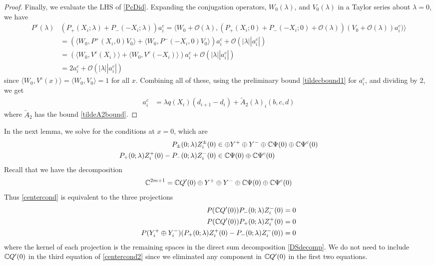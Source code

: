 \documentclass[thesis.tex]{subfiles}
\begin{document}
\begin{lemma}
\begin{proof}
Finally, we evaluate the LHS of \cref{PcDid}. Expanding the conjugation operators, $W_0(\lambda)$, and $V_0(\lambda)$ in a Taylor series about $\lambda = 0$, we have
\begin{align*}
P^c(\lambda) &(P_+(X_i; \lambda) + P_-(-X_i; \lambda))a_i^c 
= \langle W_0 + \mathcal{O}(\lambda), (P_+(X_i; 0) + P_-(-X_i; 0) + \mathcal{O}(\lambda))(V_0 + \mathcal{O}(\lambda))a_i^c) \rangle \\
&= \left( \langle W_0, P^+(X_i, 0)V_0 \rangle + \langle W_0, P^-(-X_i, 0)V_0 \rangle \right)a_i^c + \mathcal{O}(|\lambda||a_i^c|) \\
&= \left( \langle W_0, V^c(X_i) \rangle + \langle W_0, V^c(-X_i) \rangle \right)a_i^c + \mathcal{O}(|\lambda||a_i^c|) \\
&= 2 a_i^c + \mathcal{O}(|\lambda||a_i^c|)
\end{align*}
since $\langle W_0, V^c(x) \rangle = \langle W_0, V_0 \rangle = 1$ for all $x$. Combining all of these, using the preliminary bound \cref{tildecbound1} for $a_i^c$, and dividing by 2, we get
\begin{align}\label{ciexp1}
a_i^c &= \lambda q(X_i) (d_{i+1} - d_i ) + \tilde{A}_2(\lambda)_i(b, c, d)
\end{align}
where $\tilde{A}_2$ has the bound \cref{tildeA2bound}.
\end{proof}
\end{lemma}

In the next lemma, we solve for the conditions at $x = 0$, which are
\begin{equation}\label{centercond}
\begin{aligned}
P_\pm(0; \lambda) Z_i^\pm(0) &\in \oplus Y^+ \oplus Y^- \oplus \mathbb{C} \Psi(0) \oplus \mathbb{C} \Psi^c(0) \\
P_+(0; \lambda) Z_i^+(0) - P_-(0; \lambda) Z_i^-(0) &\in \mathbb{C} \Psi(0) \oplus \mathbb{C} \Psi^c(0)
\end{aligned}
\end{equation}
Recall that we have the decomposition
\begin{equation}\label{DSdecomp}
\mathbb{C}^{2m+1} = \mathbb{C} Q'(0) \oplus Y^+ \oplus Y^- \oplus \mathbb{C} \Psi(0) \oplus \mathbb{C} \Psi^c(0)
\end{equation}
Thus \eqref{centercond} is equivalent to the three projections
\begin{equation}\label{centercond2}
\begin{aligned}
P(\mathbb{C} Q'(0) ) P_-(0; \lambda) Z_i^-(0) &= 0 \\
P(\mathbb{C} Q'(0) ) P_+(0; \lambda) Z_i^+(0) &= 0 \\
P(Y_i^+ \oplus Y_i^-) ( P_+(0; \lambda) Z_i^+(0) - P_-(0; \lambda) Z_i^-(0) ) &= 0
\end{aligned}
\end{equation}
where the kernel of each projection is the remaining spaces in the direct sum decomposition \eqref{DSdecomp}. We do not need to include $\mathbb{C} Q'(0)$ in the third equation of \eqref{centercond2} since we eliminated any component in $\mathbb{C} Q'(0)$ in the first two equations.
\end{document}
